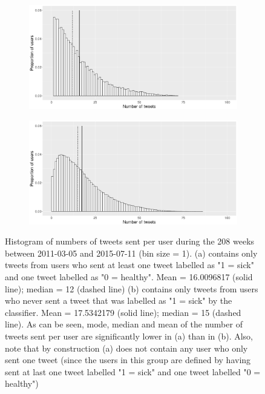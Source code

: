 \documentclass[11pt, a4paper]{article}\usepackage[]{graphicx}\usepackage[]{color}
\begin{document}
\begin{figure}[h]
\centering
  \begin{subfigure}[b]{1\textwidth}
  \includegraphics[width=1\linewidth]{user_activity_both_sick_raw_df.png}
  \caption{}
  \end{subfigure}
  \begin{subfigure}[b]{1\textwidth}
  \includegraphics[width=1\linewidth]{user_activity_only_healthy_sick_raw_df.png}
  \caption{}
  \end{subfigure}
  \caption{Histogram of numbers of tweets sent per user during the 208 weeks between 2011-03-05 and 2015-07-11 (bin size = 1). (a) contains only tweets from users who sent at least one tweet labelled as "1 = sick" and one tweet labelled as "0 = healthy".  Mean = 16.0096817 (solid line); median = 12 (dashed line) (b) contains only tweets from users who never sent a tweet that was labelled as "1 = sick" by the classifier.  Mean = 17.5342179 (solid line); median = 15 (dashed line). As can be seen, mode, median and mean of the number of tweets sent per user are significantly lower in (a) than in (b). Also, note that by construction (a) does not contain any user who only sent one tweet (since the users in this group are defined by having sent at last one tweet labelled "1 = sick" and one tweet labelled "0 = healthy")}
  \label{fig:both_vs_healthy_only_hist}

\end{figure}
\end{document}
